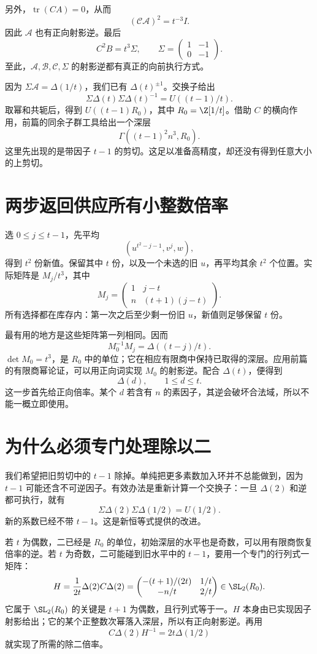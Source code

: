 另外，$\operatorname{tr}(CA)=0$，从而
\[(\mathcal C\mathcal A)^2=t^{-3}I.
\]
因此 $\mathcal A$ 也有正向射影逆。最后
\[C^2B=t^3\Sigma,\qquad
\Sigma=\begin{pmatrix}1&-1\\0&-1\end{pmatrix}.
\]
至此，$\mathcal A,\mathcal B,\mathcal C,\Sigma$ 的射影逆都有真正的向前执行方式。

因为 $\Sigma\mathcal A=\Delta(1/t)$，我们已有 $\Delta(t)^{\pm1}$。交换子给出
\[\Sigma\Delta(t)\Sigma\Delta(t)^{-1}=U((t-1)/t).
\]
取幂和共轭后，得到 $U((t-1)R_0)$，其中 $R_0=\Z[1/t]$。借助 $C$ 的横向作用，前篇的同余子群工具给出一个深层
\[\Gamma((t-1)^2n^3,R_0).
\]
这里先出现的是带因子 $t-1$ 的剪切。这足以准备高精度，却还没有得到任意大小的上剪切。

\section{两步返回供应所有小整数倍率}
选 $0\le j\le t-1$，先平均
\[(u^{t^2-j-1},v^j,w),
\]
得到 $t^2$ 份新值。保留其中 $t$ 份，以及一个未选的旧 $u$，再平均其余 $t^2$ 个位置。实际矩阵是 $M_j/t^3$，其中
\[M_j=\begin{pmatrix}1&j-t\\n&(t+1)(j-t)\end{pmatrix}.
\]
所有选择都在库存内：第一次之后至少剩一份旧 $u$，新值则足够保留 $t$ 份。

最有用的地方是这些矩阵第一列相同。因而
\[M_0^{-1}M_j=\Delta((t-j)/t).
\]
$\det M_0=t^3$，是 $R_0$ 中的单位；它在相应有限商中保持已取得的深层。应用前篇的有限商幂论证，可以用正向词实现 $M_0$ 的射影逆。配合 $\Delta(t)$，便得到
\[\Delta(d),\qquad 1\le d\le t.
\]
这一步首先给正向倍率。某个 $d$ 若含有 $n$ 的素因子，其逆会破坏合法域，所以不能一概立即使用。

\section{为什么必须专门处理除以二}
我们希望把旧剪切中的 $t-1$ 除掉。单纯把更多素数加入环并不总能做到，因为 $t-1$ 可能还含不可逆因子。有效办法是重新计算一个交换子：一旦 $\Delta(2)$ 和逆都可执行，就有
\[\Sigma\Delta(2)\Sigma\Delta(1/2)=U(1/2).
\]
新的系数已经不带 $t-1$。这是新恒等式提供的改进。

若 $t$ 为偶数，二已经是 $R_0$ 的单位，初始深层的水平也是奇数，可以用有限商恢复倍率的逆。若 $t$ 为奇数，二可能碰到旧水平中的 $t-1$，要用一个专门的行列式一矩阵：
\[
H=\frac1{2t}\Delta(2)C\Delta(2)
=\begin{pmatrix}
-(t+1)/(2t)&1/t\\-n/t&2/t
\end{pmatrix}\in\SL_2(R_0).
\]
它属于 $\SL_2(R_0)$ 的关键是 $t+1$ 为偶数，且行列式等于一。$H$ 本身由已实现因子射影给出；它的某个正整数次幂落入深层，所以有正向射影逆。再用
\[C\Delta(2)H^{-1}=2t\Delta(1/2)
\]
就实现了所需的除二倍率。

